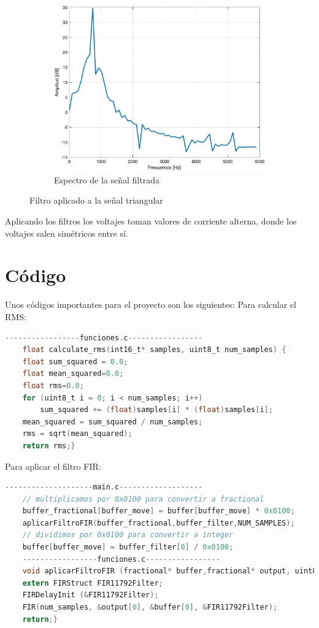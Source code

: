 \documentclass{article}
\begin{document}
\begin{figure}[H]
\begin{subfigure}{.3\textwidth}
    \end{subfigure}
    \hfill
    \begin{subfigure}{.3\textwidth}
        \centering
        \includegraphics[width=\linewidth]{images/V2_Espectro.png}
        \caption{Espectro de la señal filtrada}
        \label{fig:triangular_3}
    \end{subfigure}    \caption{Filtro aplicado a la señal triangular}
    \label{fig:triangular_filtro}
\end{figure}

Aplicando los filtros los voltajes toman valores de corriente alterna, donde los voltajes salen simétricos entre sí.
\section{Código}
Unos códigos importantes para el proyecto son los siguientes:
Para calcular el RMS:
\begin{lstlisting}[language=C]
    -----------------funciones.c-----------------
    float calculate_rms(int16_t* samples, uint8_t num_samples) {
    float sum_squared = 0.0;
    float mean_squared=0.0;
    float rms=0.0;
    for (uint8_t i = 0; i < num_samples; i++) 
        sum_squared += (float)samples[i] * (float)samples[i];
    mean_squared = sum_squared / num_samples;
    rms = sqrt(mean_squared);
    return rms;}
\end{lstlisting}
Para aplicar el filtro FIR:
\begin{lstlisting}[language=C]
    --------------------main.c-------------------
    // multiplicamos por 0x0100 para convertir a fractional
    buffer_fractional[buffer_move] = buffer[buffer_move] * 0x0100;
    aplicarFiltroFIR(buffer_fractional,buffer_filter,NUM_SAMPLES);
    // dividimos por 0x0100 para convertir a integer
    buffer[buffer_move] = buffer_filter[0] / 0x0100;
    -----------------funciones.c-----------------
    void aplicarFiltroFIR (fractional* buffer,fractional* output, uint8_t num_samples){
    extern FIRStruct FIR11792Filter;
    FIRDelayInit (&FIR11792Filter); 
    FIR(num_samples, &output[0], &buffer[0], &FIR11792Filter);
    return;}
\end{lstlisting}
\end{document}
